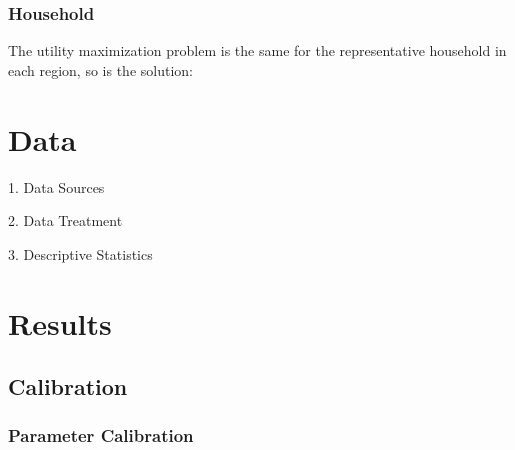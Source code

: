 \documentclass[
	12pt, 
	]{article}
\numberwithin{equation}{section}
\theoremstyle{definition}
\theoremstyle{plain}
\theoremstyle{plain}
\theoremstyle{plain}
\begin{document}
\newpage

\subsubsection{Household}

The utility maximization problem is the same for the representative household in each region, so is the solution:

\newpage


\section{Data}

\lipsum[1]

1. Data Sources

2. Data Treatment

3. Descriptive Statistics


\section{Results}

\lipsum[1]

\subsection{Calibration}


\subsubsection{Parameter Calibration}

\vspace*{-1cm}
\end{document}
